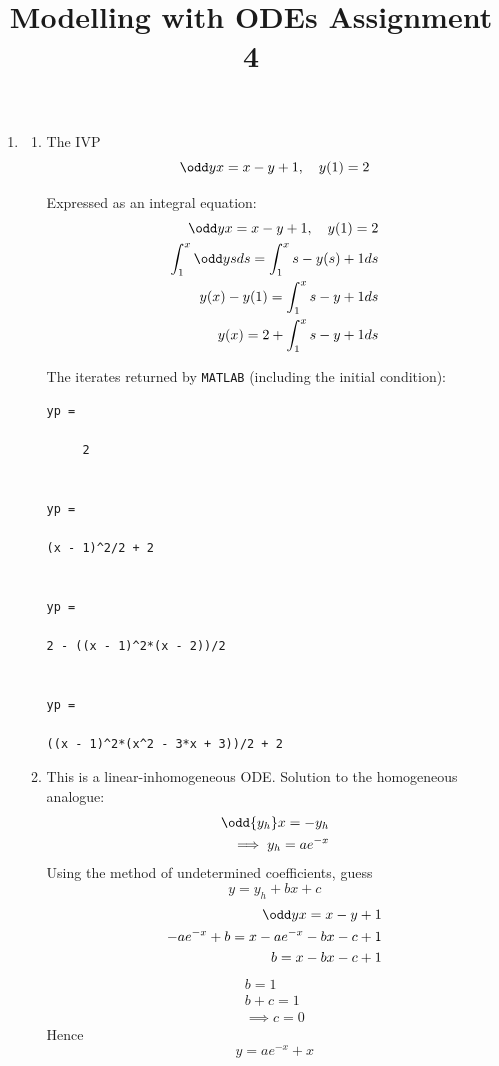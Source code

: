 \documentclass{X:/Documents/Coding/Latex/myassignment}
\title{Modelling with ODEs Assignment 4}
\begin{document}
\maketitle
\begin{enumerate}
	\item 

	\begin{enumerate}
		\item The IVP
		\[\odd yx = x -y +1, \quad y(1) = 2\]

		Expressed as an integral equation:
		\begin{align*}
			\odd yx = x -y +1, \quad y(1) = 2\\
			\int_{1}^{x} \odd ys ds = \int_{1}^{x} s - y(s) +1 ds\\
			y(x) - y(1) = \int_1^{x} s - y + 1 ds\\
			y(x) = 2 + \int_1^{x} s - y + 1 ds
		\end{align*}

		The iterates returned by \verb|MATLAB| (including the initial condition):
\begin{verbatim}
yp =

     2

 
yp =
 
(x - 1)^2/2 + 2
 
 
yp =
 
2 - ((x - 1)^2*(x - 2))/2
 
 
yp =
 
((x - 1)^2*(x^2 - 3*x + 3))/2 + 2
\end{verbatim}
		
		\item This is a linear-inhomogeneous ODE. Solution to the homogeneous analogue:
		\begin{align*}
			\odd{y_h}x = -y_h\\
			\implies y_h = ae^{-x}
		\end{align*}
		Using the method of undetermined coefficients, guess 
		\[y = y_h + bx + c\]
		\begin{align*}
			\odd yx = x -y +1\\
			-ae^{-x} + b = x - ae^{-x} - bx - c + 1\\
			b = x - bx - c + 1\\
		\end{align*}
		\begin{align*}
			b = 1\\
			b+c = 1\\
			\implies c=0
		\end{align*}
		Hence
		\[y = ae^{-x} +x\]



\end{enumerate}
\end{enumerate}
\end{document}
